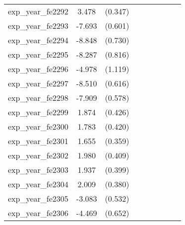{\begin{tabular}{l*{4}{cc}}
exp\_year\_fe2292&    3.478\sym{***}&  (0.347)&                  &         &                  &         &                  &         \\
exp\_year\_fe2293&   -7.693\sym{***}&  (0.601)&                  &         &                  &         &                  &         \\
exp\_year\_fe2294&   -8.848\sym{***}&  (0.730)&                  &         &                  &         &                  &         \\
exp\_year\_fe2295&   -8.287\sym{***}&  (0.816)&                  &         &                  &         &                  &         \\
exp\_year\_fe2296&   -4.978\sym{***}&  (1.119)&                  &         &                  &         &                  &         \\
exp\_year\_fe2297&   -8.510\sym{***}&  (0.616)&                  &         &                  &         &                  &         \\
exp\_year\_fe2298&   -7.909\sym{***}&  (0.578)&                  &         &                  &         &                  &         \\
exp\_year\_fe2299&    1.874\sym{***}&  (0.426)&                  &         &                  &         &                  &         \\
exp\_year\_fe2300&    1.783\sym{***}&  (0.420)&                  &         &                  &         &                  &         \\
exp\_year\_fe2301&    1.655\sym{***}&  (0.359)&                  &         &                  &         &                  &         \\
exp\_year\_fe2302&    1.980\sym{***}&  (0.409)&                  &         &                  &         &                  &         \\
exp\_year\_fe2303&    1.937\sym{***}&  (0.399)&                  &         &                  &         &                  &         \\
exp\_year\_fe2304&    2.009\sym{***}&  (0.380)&                  &         &                  &         &                  &         \\
exp\_year\_fe2305&   -3.083\sym{***}&  (0.532)&                  &         &                  &         &                  &         \\
exp\_year\_fe2306&   -4.469\sym{***}&  (0.652)&                  &         &                  &         &                  &         \\

\end{tabular}}
